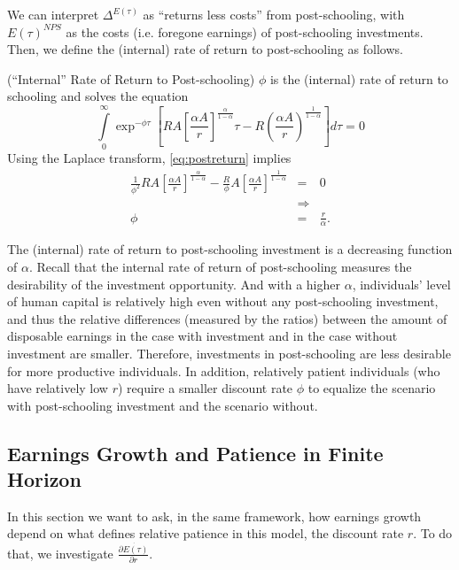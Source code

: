 \indent We can interpret $\Delta^{E(\tau)}$ as ``returns less costs'' from post-schooling, with $E(\tau)^{NPS}$ as the costs (i.e. foregone earnings) of post-schooling investments. Then, we define the (internal) rate of return to post-schooling as follows.

\begin{definition} (``Internal'' Rate of Return to Post-schooling)
$\phi$ is the (internal) rate of return to schooling and solves the equation
\begin{equation}
\int \limits _{0} ^{\infty} \exp^{- \phi \tau} \left[ R A \left[ \frac{\alpha A}{r} \right]^{\frac{\alpha}{1-\alpha}} \tau - R \left( \frac{\alpha A}{r} \right)^{\frac{1}{1 - \alpha}} \right] d \tau = 0 \label{eq:postreturn}
\end{equation}
\noindent Using the Laplace transform, \eqref{eq:postreturn} implies
\begin{eqnarray}
\frac{1}{\phi^2} RA \left[ \frac{\alpha A}{r} \right]^{\frac{\alpha}{1-\alpha}} - \frac{R}{\phi} A \left[ \frac{\alpha A}{r} \right]^{\frac{1}{1-\alpha}} &=& 0 \nonumber \\
&\Rightarrow& \nonumber \\
\phi &=& \frac{r}{\alpha}.
\end{eqnarray}
\end{definition}

\indent The (internal) rate of return to post-schooling investment is a decreasing function of $\alpha$. Recall that the internal rate of return of post-schooling measures the desirability of the investment opportunity. And with a higher $\alpha$, individuals' level of human capital is relatively high even without any post-schooling investment, and thus the relative differences (measured by the ratios) between the amount of disposable earnings in the case with investment and in the case without investment are smaller. Therefore, investments in post-schooling are less desirable for more productive individuals. In addition, relatively patient individuals (who have relatively low $r$) require a smaller discount rate $\phi$ to equalize the scenario with post-schooling investment and the scenario without.

\subsection{Earnings Growth and Patience in Finite Horizon}
In this section we want to ask, in the same framework, how earnings growth depend on what defines relative patience in this model, the discount rate $r$. To do that, we investigate $\frac{\partial \dot{E(\tau)}}{\partial r}$.

